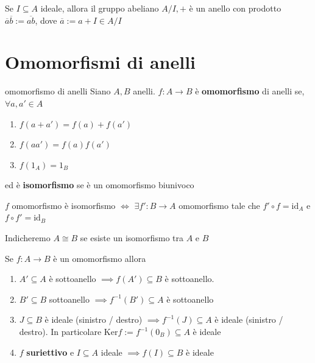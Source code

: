 \begin{proposition}
    Se \(I \subseteq A \) ideale, allora il gruppo abeliano \(A / I , +\)  è un
    anello con prodotto \(\overline{a} \overline{b} := \overline{ab}\), dove \(\overline{a} := a + I \in A / I\) 
\end{proposition}

\section{Omomorfismi di anelli}

\begin{definition}{omomorfismo di anelli}
    Siano \(A, B\) anelli. \(f: A\to B\) è \textbf{omomorfismo} di anelli se, \(\forall a, a' \in A\) 
\begin{enumerate}[label = \roman*)]
    \item \(f{(a + a')} = f{(a)} + f{(a')}\) 
    \item \(f{(a a')} = f{(a)}f{(a')}\) 
    \item \(f{(1_A)} = 1_B\) 
\end{enumerate}
ed è \textbf{isomorfismo} se è un omomorfismo biunivoco
\end{definition}
\begin{remark}{}
    \(f\) omomorfismo è isomorfismo \(\iff\) \(\exists f' : B\to A\) omomorfismo
    tale che \(f' \circ f = \mathrm{id}_A\) e \(f \circ f' = \mathrm{id}_B\) 
\end{remark}
Indicheremo \(A \cong B\) se esiste un isomorfismo tra \(A\) e \(B\) 
\begin{proposition}{}
    Se \(f : A\to B\) è un omomorfismo allora
\begin{enumerate}[label = \arabic*.]
    \item \(A' \subseteq A \) è sottoanello \(\implies f{(A')} \subseteq B  \) è
        sottoanello.
    \item \(B' \subseteq B \) sottoanello \(\implies f^{-1}{(B')} \subseteq A \) è sottoanello
    \item \(J \subseteq B \) è ideale (sinistro / destro) \(\implies f^{-1}{(J)} \subseteq A \) è ideale (sinistro / destro). In particolare \(\mathrm{Ker}f := f^{-1}{(0_B)} \subseteq A \) è ideale
    \item \(f\) \textbf{suriettivo} e \(I \subseteq A \) ideale \(\implies f{(I)} \subseteq B \) è ideale
\end{enumerate}
\end{proposition}

